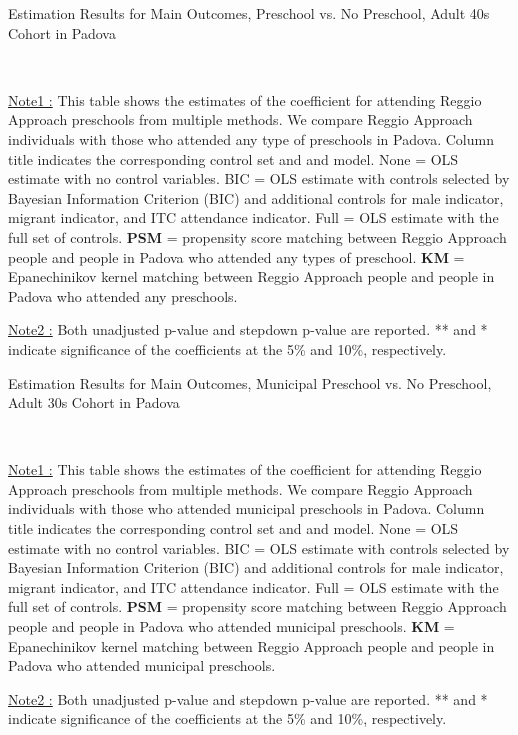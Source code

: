 \begin{table}[H] \caption{Estimation Results for Main Outcomes, Preschool vs. No Preschool, Adult 40s Cohort in Padova} \label{ols-M-adult40-reg-pres-padova}
\scalebox{0.62}{}
\vspace{1ex} \\
\footnotesize\raggedright{\underline{Note1 :} This table shows the estimates of the coefficient for attending Reggio Approach preschools from multiple methods. We compare Reggio Approach individuals with those who attended any type of preschools in Padova. Column title indicates the corresponding control set and and model. None = OLS estimate with no control variables. BIC = OLS estimate with controls selected by Bayesian Information Criterion (BIC) and additional controls for male indicator, migrant indicator, and ITC attendance indicator. Full = OLS estimate with the full set of controls. \textbf{PSM} =  propensity score matching between Reggio Approach people and people in Padova who attended any types of preschool. \textbf{KM} = Epanechinikov kernel matching between Reggio Approach people and people in Padova who attended any preschools.}

\footnotesize\raggedright{\underline{Note2 :} Both unadjusted p-value and stepdown p-value are reported. ** and * indicate significance of the coefficients at the 5\% and 10\%, respectively.}

\end{table}




\begin{table}[H] \caption{Estimation Results for Main Outcomes, Municipal Preschool vs. No Preschool, Adult 30s Cohort in Padova} \label{ols-M-adult30-reg-muni-padova}
\scalebox{0.62}{}
\vspace{1ex} \\
\footnotesize\raggedright{\underline{Note1 :} This table shows the estimates of the coefficient for attending Reggio Approach preschools from multiple methods. We compare Reggio Approach individuals with those who attended municipal preschools in Padova. Column title indicates the corresponding control set and and model. None = OLS estimate with no control variables. BIC = OLS estimate with controls selected by Bayesian Information Criterion (BIC) and additional controls for male indicator, migrant indicator, and ITC attendance indicator. Full = OLS estimate with the full set of controls. \textbf{PSM} =  propensity score matching between Reggio Approach people and people in Padova who attended municipal preschools. \textbf{KM} = Epanechinikov kernel matching between Reggio Approach people and people in Padova who attended municipal preschools.}

\footnotesize\raggedright{\underline{Note2 :} Both unadjusted p-value and stepdown p-value are reported. ** and * indicate significance of the coefficients at the 5\% and 10\%, respectively.}
\end{table}








